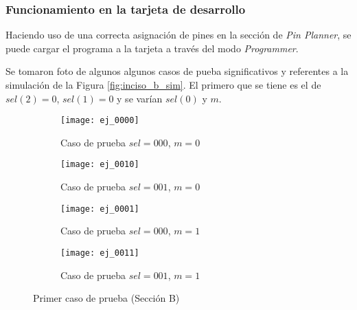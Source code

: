\documentclass[../procedimientos.tex]{subfiles}
\begin{document}
\subsubsection*{Funcionamiento en la tarjeta de desarrollo}
Haciendo uso de una correcta asignación de pines en la sección de \textit{Pin 
Planner}, se puede cargar el programa a la tarjeta a través del modo 
\textit{Programmer}.

Se tomaron foto de algunos algunos casos de pueba significativos y referentes 
a la simulación de la Figura \ref{fig:inciso_b_sim}. El primero que se tiene 
es el de $sel(2) = 0$, $sel(1) = 0$ y se varían $sel(0)$ y $m$.
\begin{figure}[H]
  \centering
  \begin{subfigure}[b]{0.45\textwidth}
    \centering
    \texttt{[image: ej\_0000]}
    \caption{Caso de prueba $sel = 000$, $m = 0$}
    \label{fig:b_tarj_1}
  \end{subfigure}
  \begin{subfigure}[b]{0.45\textwidth}
    \centering
    \texttt{[image: ej\_0010]}
    \caption{Caso de prueba $sel = 001$, $m = 0$}
    \label{fig:b_tarj_2}
  \end{subfigure}
  \begin{subfigure}[b]{0.45\textwidth}
    \centering
    \texttt{[image: ej\_0001]}
    \caption{Caso de prueba $sel = 000$, $m = 1$}
    \label{fig:b_tarj_3}
  \end{subfigure}
  \begin{subfigure}[b]{0.45\textwidth}
    \centering
    \texttt{[image: ej\_0011]}
    \caption{Caso de prueba $sel = 001$, $m = 1$}
    \label{fig:b_tarj_4}
  \end{subfigure}
  \caption{Primer caso de prueba (Sección B)}
\end{figure}
\end{document}
